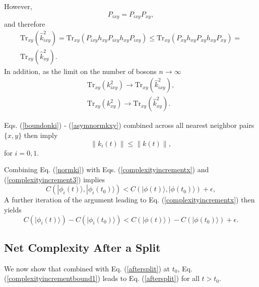 \documentclass[12pt,amsmath,amssymb,onecolumn]{revtex4-2}
\begin{document}
However,
\begin{equation}
  \label{ppi}
  P_{ixy} = P_{ixy} P_{xy},
  \end{equation}
and therefore
\begin{multline}
  \label{boundonki}
  \mathrm{Tr}_{xy}( \hat{k}_{ixy}^2) = \mathrm{Tr}_{xy}( P_{ixy} h_{xy} P_{ixy} h_{xy}P_{ixy}) \le 
  \mathrm{Tr}_{xy} (P_{xy} h_{xy} P_{xy} h_{xy} P_{xy}) = \\
  \mathrm{Tr}_{xy}( \hat{k}_{xy}^2).
\end{multline}
In addition, as the limit on the number of bosons $n \rightarrow \infty$ 
\begin{subequations}
\begin{eqnarray}
  \label{asymnormkixy}
  \mathrm{Tr}_{xy}(k_{ixy}^2) \rightarrow \mathrm{Tr}_{xy}(\hat{k}_{ixy}^2), \\
  \label{asymnormkxy}
  \mathrm{Tr}_{xy}(k_{xy}^2) \rightarrow \mathrm{Tr}_{xy}(\hat{k}_{xy}^2).
\end{eqnarray}
\end{subequations}

Eqs. (\ref{boundonki}) - (\ref{asymnormkxy})  combined across all nearest neighbor pairs $\{x, y\}$ then imply
\begin{equation}
  \label{normki}
  \parallel k_i(t) \parallel \le \parallel k(t) \parallel,
\end{equation}
for $i = 0, 1$.


Combining Eq. (\ref{normki}) with Eqs. (\ref{complexityincrementx}) and (\ref{complexityincrement3})
implies 
\begin{equation}
  \label{complexityincrementbound}
  C( |\phi_i(t) \rangle , |\phi_i(t_0) \rangle ) < C( |\phi(t) \rangle , |\phi(t_0) \rangle ) + \epsilon,
\end{equation}
A further iteration of the argument leading to Eq. (\ref{complexityincrementx})
then yields
\begin{equation}
  \label{complexityincrementbound1}
  C( |\phi_i(t) \rangle ) - C(|\phi_i(t_0) \rangle ) < 
  C( |\phi(t) \rangle ) - C(|\phi(t_0) \rangle ) + \epsilon.
\end{equation}



\subsection{\label{subsec:after1} Net Complexity After a Split}

We now show that combined with Eq. (\ref{aftersplit}) at
$t_0$, Eq. (\ref{complexityincrementbound1}) leads
to Eq. (\ref{aftersplit}) for all $t > t_0$.
\end{document}
